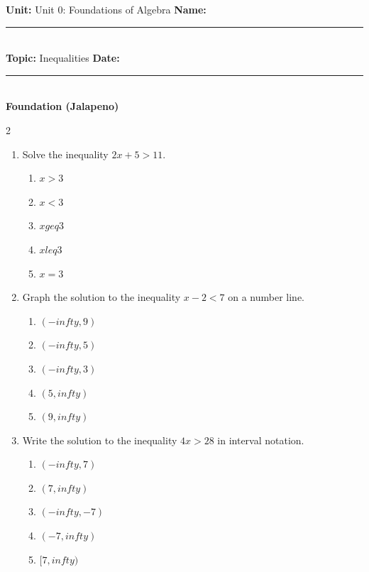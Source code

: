 \documentclass[10pt]{article}
\begin{document}
\enlargethispage{2.5cm}

\begin{tcolorbox}[colback=mainblue!5, colframe=mainblue, sharp corners, boxrule=0.5pt]
    \small \textbf{Unit:} Unit 0: Foundations of Algebra \hfill \textbf{Name:} \rule{3cm}{0.4pt} \\
    \small \textbf{Topic:} Inequalities \hfill \textbf{Date:} \rule{2cm}{0.4pt} \\
    \centering \textbf{\large Foundation (Jalapeno)}
\end{tcolorbox}

\vspace{0.2cm}

\begin{multicols}{2}
\begin{enumerate}[label=\textbf{Q\arabic*.}, leftmargin=*, itemsep=6pt, parsep=0pt]

  \item \small Solve the inequality $2x + 5 > 11$.
  \begin{enumerate}[label=(\Alph*), leftmargin=0.6cm, nosep, itemsep=2pt]
    \item $x > 3$
    \item $x < 3$
    \item $x geq 3$
    \item $x leq 3$
    \item $x = 3$
  \end{enumerate}

  \item \small Graph the solution to the inequality $x - 2 < 7$ on a number line.
  \begin{enumerate}[label=(\Alph*), leftmargin=0.6cm, nosep, itemsep=2pt]
    \item $(-infty, 9)$
    \item $(-infty, 5)$
    \item $(-infty, 3)$
    \item $(5, infty)$
    \item $(9, infty)$
  \end{enumerate}

  \item \small Write the solution to the inequality $4x > 28$ in interval notation.
  \begin{enumerate}[label=(\Alph*), leftmargin=0.6cm, nosep, itemsep=2pt]
    \item $(-infty, 7)$
    \item $(7, infty)$
    \item $(-infty, -7)$
    \item $(-7, infty)$
    \item $[7, infty)$
  \end{enumerate}


\end{enumerate}
\end{multicols}
\end{document}
